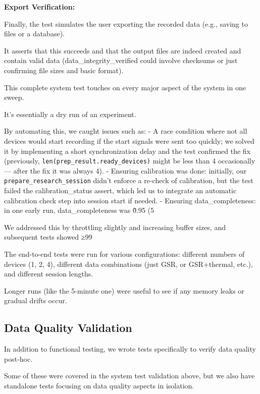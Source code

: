 {{{\textbf{Export Verification:}

Finally, the test simulates the user exporting the recorded data (e.g., saving to files or a database).

It asserts that this succeeds and that the output files are indeed created and contain valid data (data\_integrity\_verified could involve checksums or just confirming file sizes and basic format).

This complete system test touches on every major aspect of the system in one sweep.

It's essentially a dry run of an experiment.

By automating this, we caught issues such as: - A race condition where not all devices would start recording if the start signals were sent too quickly; we solved it by implementing a short synchronization delay and the test confirmed the fix (previously, \texttt{len(prep\_result.ready\_devices)} might be less than 4 occasionally --- after the fix it was always 4). - Ensuring calibration was done: initially, our \texttt{prepare\_research\_session} didn't enforce a re-check of calibration, but the test failed the calibration\_status assert, which led us to integrate an automatic calibration check step into session start if needed. - Ensuring data\_completeness: in one early run, data\_completeness was \~0.95 (5%

We addressed this by throttling slightly and increasing buffer sizes, and subsequent tests showed ≥99%

The end-to-end tests were run for various configurations: different numbers of devices (1, 2, 4), different data combinations (just GSR, or GSR+thermal, etc.), and different session lengths.

Longer runs (like the 5-minute one) were useful to see if any memory leaks or gradual drifts occur.

\subsection{Data Quality Validation}

In addition to functional testing, we wrote tests specifically to verify data quality post-hoc.

Some of these were covered in the system test validation above, but we also have standalone tests focusing on data quality aspects in isolation.

}}}
